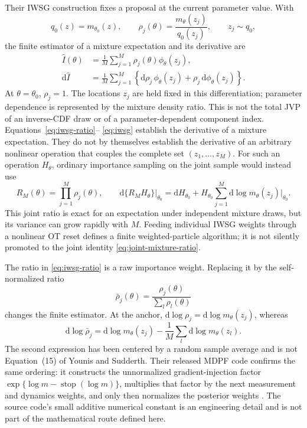 \documentclass[11pt]{article}
\newcommand{\dd}{\mathrm{d}}
\newcommand{\OT}{\ensuremath{\mathrm{OT}}}
\begin{document}
Their IWSG construction fixes a proposal at the current parameter value.  With
\begin{equation}
 q_0(z)=m_{\theta_0}(z),\qquad
 \rho_j(\theta)=\frac{m_\theta(z_j)}{q_0(z_j)},\qquad
 z_j\sim q_0,
 \label{eq:iwsg-ratio}
\end{equation}
the finite estimator of a mixture expectation and its derivative are
\begin{align}
 \widehat I(\theta)
   &=\frac{1}{M}\sum_{j=1}^{M}\rho_j(\theta)\phi_\theta(z_j),\\
 \dd\widehat I
   &=\frac{1}{M}\sum_{j=1}^{M}
       \left\{\dd\rho_j\,\phi_\theta(z_j)
              +\rho_j\,\dd\phi_\theta(z_j)\right\}.
 \label{eq:iwsg}
\end{align}
At $\theta=\theta_0$, $\rho_j=1$.  The locations $z_j$ are held fixed in
this differentiation; parameter dependence is represented by the mixture
density ratio.  This is not the total JVP of an inverse-CDF draw or of a
parameter-dependent component index.  Equations~\eqref{eq:iwsg-ratio}--
\eqref{eq:iwsg} establish the derivative of a mixture expectation.  They do
not by themselves establish the derivative of an arbitrary nonlinear
operation that couples the complete set $(z_1,\ldots,z_M)$.  For such an
operation $H_\theta$, ordinary importance sampling on the joint sample would
instead use
\begin{equation}
 R_M(\theta)=\prod_{j=1}^M\rho_j(\theta),\qquad
 \dd\{R_M H_\theta\}\big|_{\theta_0}
 =\dd H_{\theta_0}+H_{\theta_0}
   \sum_{j=1}^M\dd\log m_\theta(z_j)\big|_{\theta_0}.
 \label{eq:joint-mixture-ratio}
\end{equation}
This joint ratio is exact for an expectation under independent mixture draws,
but its variance can grow rapidly with $M$.  Feeding individual IWSG weights
through a nonlinear \OT{} reset defines a finite weighted-particle algorithm;
it is not silently promoted to the joint identity
\eqref{eq:joint-mixture-ratio}.

The ratio in \eqref{eq:iwsg-ratio} is a raw importance weight.  Replacing it
by the self-normalized ratio
\begin{equation}
 \bar\rho_j(\theta)=\frac{\rho_j(\theta)}{\sum_l\rho_l(\theta)}
 \label{eq:self-normalized-ratio}
\end{equation}
changes the finite estimator.  At the anchor,
$\dd\log\rho_j=\dd\log m_\theta(z_j)$, whereas
\begin{equation}
 \dd\log\bar\rho_j
 =\dd\log m_\theta(z_j)
  -\frac1M\sum_l\dd\log m_\theta(z_l).
 \label{eq:centered-ratio-tangent}
\end{equation}
The second expression has been centered by a random sample average and is not
Equation~(15) of Younis and Sudderth.  Their released MDPF code confirms the
same ordering: it constructs the unnormalized gradient-injection factor
$\exp\{\log m-\operatorname{stop}(\log m)\}$, multiplies that factor by the
next measurement and dynamics weights, and only then normalizes the posterior
weights \citep{youniscode2023}.  The source code's small additive numerical
constant is an engineering detail and is not part of the mathematical route
defined here.
\end{document}
